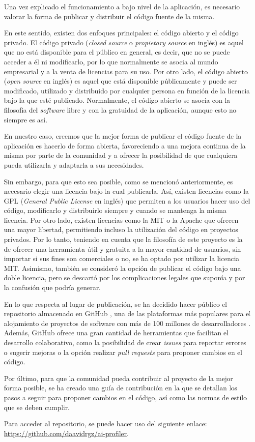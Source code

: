 Una vez explicado el funcionamiento a bajo nivel de la aplicación, es necesario valorar la forma de publicar y
distribuir el código fuente de la misma.

\bigskip
En este sentido, existen dos enfoques principales: el código abierto y el código privado.
El código privado (\textit{closed source} o \textit{propietary source} en inglés) es aquel que no está disponible para el público en general, es decir, que no se puede acceder a él ni
modificarlo, por lo que normalmente se asocia al mundo empresarial y a la venta de licencias para su uso.
Por otro lado, el código abierto (\textit{open source} en inglés) es aquel que
está disponible públicamente y puede ser modificado, utilizado y distribuido por cualquier persona en función
de la licencia bajo la que esté publicado. Normalmente, el código abierto se asocia con la filosofía del \textit{software} libre
y con la gratuidad de la aplicación, aunque esto no siempre es así.

\bigskip
En nuestro caso, creemos que la mejor forma de publicar el código fuente de la aplicación es hacerlo de forma abierta,
favoreciendo a una mejora continua de la misma por parte de la comunidad y a ofrecer la posibilidad de que cualquiera pueda
utilizarla y adaptarla a sus necesidades.

\bigskip
Sin embargo, para que esto sea posible, como se mencionó anteriormente, es necesario elegir una licencia bajo la cual publicarla. Así, existen licencias
como la GPL (\textit{General Public License} en inglés) \cite{gpl} que permiten a los usuarios hacer uso del código, modificarlo y distribuirlo
siempre y cuando se mantenga la misma licencia. Por otro lado, existen licencias como la MIT \cite{mitlicense} o la Apache \cite{apachelicense} que ofrecen una mayor libertad,
permitiendo incluso la utilización del código en proyectos privados. Por lo tanto, teniendo en cuenta que la filosofía de este proyecto es la de ofrecer una herramienta útil y gratuita a la mayor
cantidad de usuarios, sin importar si sus fines son comerciales o no, se ha optado por utilizar la licencia MIT. Asimismo, también se consideró la opción de publicar el código
bajo una doble licencia, pero se descartó por los complicaciones legales que suponía y por la confusión que podría generar.

\bigskip
En lo que respecta al lugar de publicación, se ha decidido hacer público el repositorio almacenado en GitHub \cite{github}, una de las
plataformas más populares para el alojamiento de proyectos de software con más de 100 millones de desarrolladores \cite{100milliongithub}.
Además, GitHub ofrece una gran cantidad de herramientas que facilitan el desarrollo colaborativo, como la posibilidad de crear \textit{issues} para
reportar errores o sugerir mejoras o la opción realizar \textit{pull requests} para proponer cambios en el código.

\bigskip
Por último, para que la comunidad pueda contribuir al proyecto de la mejor forma posible, se ha creado una guía de contribución
en la que se detallan los pasos a seguir para proponer cambios en el código, así como las normas de estilo que se deben cumplir.

\bigskip
Para acceder al repositorio, se puede hacer uso del siguiente enlace: \url{https://github.com/daavidrgz/ai-profiler}.
